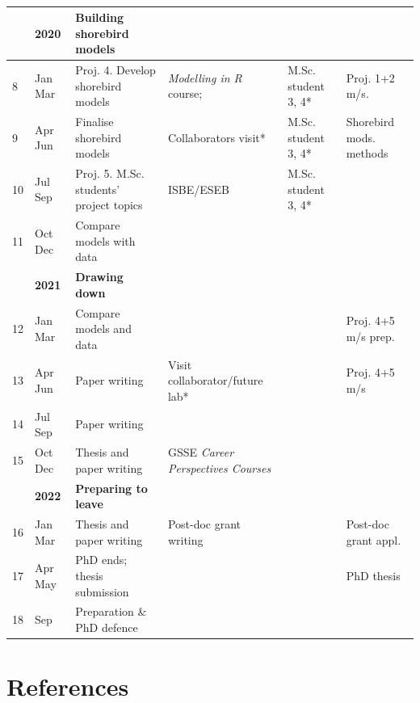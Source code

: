 \begin{table}
\begin{turn}{90}
\begin{tabular}{llllll}
\toprule
 & \textbf{\footnotesize{}2020} & \textbf{\footnotesize{}Building shorebird models} &  &  & \tabularnewline
\hline
{\footnotesize{}8} & {\footnotesize{}Jan \textendash{} Mar} & {\footnotesize{}Proj. 4. Develop shorebird models} & {\footnotesize{}\emph{Modelling in R} course;} & {\footnotesize{}M.Sc. student 3, 4{*}} & {\footnotesize{}Proj. 1+2 m/s.}\tabularnewline
\hdashline
{\footnotesize{}9} & {\footnotesize{}Apr \textendash{} Jun} & {\footnotesize{}Finalise shorebird models} & {\footnotesize{}Collaborators visit*} & {\footnotesize{}M.Sc. student 3, 4{*}} & {\footnotesize{}Shorebird mods. methods}\tabularnewline
\hdashline
{\footnotesize{}10} & {\footnotesize{}Jul \textendash{} Sep} & {\footnotesize{}Proj. 5. M.Sc. students' project topics} & {\footnotesize{}ISBE/ESEB} & {\footnotesize{}M.Sc. student 3, 4{*}} & \tabularnewline
\hdashline
{\footnotesize{}11} & {\footnotesize{}Oct \textendash{} Dec} & {\footnotesize{}Compare models with data} &  &  & \tabularnewline

\toprule
 & \textbf{\footnotesize{}2021} & \textbf{\footnotesize{}Drawing down} &  &  & \tabularnewline
\hline
{\footnotesize{}12} & {\footnotesize{}Jan \textendash{} Mar} & {\footnotesize{}Compare models and data} &  &  & {\footnotesize{}Proj. 4+5 m/s prep.}\tabularnewline
\hdashline
{\footnotesize{}13} & {\footnotesize{}Apr \textendash{} Jun} & {\footnotesize{}Paper writing} & {\footnotesize{}Visit collaborator/future lab{*}} &  & {\footnotesize{}Proj. 4+5 m/s}\tabularnewline
\hdashline
{\footnotesize{}14} & {\footnotesize{}Jul \textendash{} Sep} & {\footnotesize{}Paper writing} &  &  & \tabularnewline
\hdashline
{\footnotesize{}15} & {\footnotesize{}Oct \textendash{} Dec} & {\footnotesize{}Thesis and paper writing} & {\footnotesize{}GSSE \emph{Career Perspectives Courses}} &  & \tabularnewline

\toprule
 & \textbf{\footnotesize{}2022} & \textbf{\footnotesize{}Preparing to leave} &  &  & \tabularnewline
\hline
{\footnotesize{}16} & {\footnotesize{}Jan \textendash{} Mar} & {\footnotesize{}Thesis and paper writing} & {\footnotesize{}Post-doc grant writing} &  & {\footnotesize{}Post-doc grant appl.}\tabularnewline
\hdashline
{\footnotesize{}17} & {\footnotesize{}Apr \textendash{} May} & {\footnotesize{}PhD ends; thesis submission} &  &  & {\footnotesize{}PhD thesis}\tabularnewline
\hdashline
{\footnotesize{}18} & {\footnotesize{} Sep} & {\footnotesize{}Preparation \& PhD defence} &  &  & \tabularnewline

\bottomrule

\end{tabular}
\end{turn}

\caption{}

\end{table}

\newpage

\restoregeometry

\chapter*{References}\label{chapter:References}


\footnotesize

\setlength{\parskip}{3pt plus 2pt minus 1pt}
\setlength{\parindent}{-3ex}
\indent



